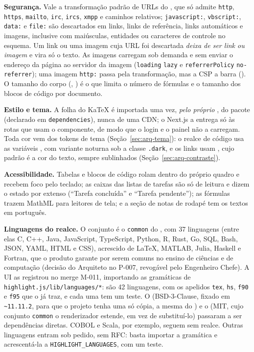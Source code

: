 \textbf{Segurança.} Vale a transformação padrão de URLs do , que só admite \texttt{http}, \texttt{https}, \texttt{mailto}, \texttt{irc}, \texttt{ircs}, \texttt{xmpp} e caminhos relativos; \texttt{javascript:}, \texttt{vbscript:}, \texttt{data:} e \texttt{file:} são descartados em links, links de referência, links automáticos e imagens, inclusive com maiúsculas, entidades ou caracteres de controle no esquema. Um link ou uma imagem cuja URL foi descartada \emph{deixa de ser link ou imagem} e vira só o texto. As imagens carregam sob demanda e sem enviar o endereço da página ao servidor da imagem (\texttt{loading} \texttt{lazy} e \texttt{referrerPolicy} \texttt{no-referrer}); uma imagem \texttt{http:} passa pela transformação, mas a CSP a barra (). O tamanho do corpo (, ) é o que limita o número de fórmulas e o tamanho dos blocos de código por documento.

\textbf{Estilo e tema.} A folha do KaTeX é importada uma vez, \emph{pelo próprio} , do pacote  (declarado em \texttt{dependencies}), nunca de uma CDN; o Next.js a entrega só às rotas que usam o componente, de modo que o login e o painel não a carregam. Toda cor vem dos tokens de tema (Seção~\ref{sec:arq-tema}): o realce de código usa as variáveis , com variante noturna sob a classe \texttt{.dark}, e os links usam , cujo padrão é a cor do texto, sempre sublinhados (Seção~\ref{sec:arq-contraste}).

\textbf{Acessibilidade.} Tabelas e blocos de código rolam dentro do próprio quadro e recebem foco pelo teclado; as caixas das listas de tarefas são só de leitura e dizem o estado por extenso (``Tarefa concluída'' e ``Tarefa pendente''); as fórmulas trazem MathML para leitores de tela; e a seção de notas de rodapé tem os textos em português.

\textbf{Linguagens do realce.} O conjunto é o \texttt{common} do , com 37 linguagens (entre elas C, C++, Java, JavaScript, TypeScript, Python, R, Rust, Go, SQL, Bash, JSON, YAML, HTML e CSS), acrescido de LaTeX, MATLAB, Julia, Haskell e Fortran, que o produto garante por serem comuns no ensino de ciências e de computação (decisão do Arquiteto no P-007, revogável pelo Engenheiro Chefe). A UI as registrou no merge M-011, importando as gramáticas de \texttt{highlight.js/lib/languages/*}: são 42 linguagens, com os apelidos \texttt{tex}, \texttt{hs}, \texttt{f90} e \texttt{f95} que o  já traz, e cada uma tem um teste. O  (BSD-3-Clause, fixado em \texttt{\~{}11.11.2}, para que o projeto tenha uma só cópia, a mesma do ) e o  (MIT, cujo conjunto \texttt{common} o renderizador estende, em vez de substituí-lo) passaram a ser dependências diretas. COBOL e Scala, por exemplo, seguem sem realce. Outras linguagens entram sob pedido, sem RFC: basta importar a gramática e acrescentá-la a \texttt{HIGHLIGHT\_LANGUAGES}, com um teste.

